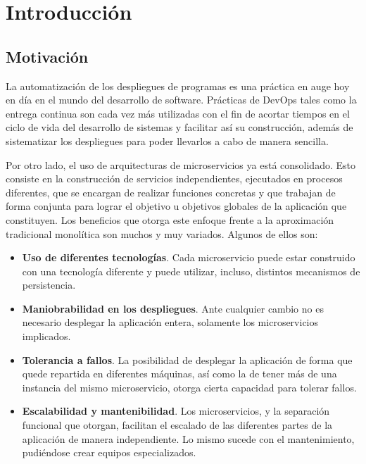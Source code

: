 \documentclass[11pt,spanish,listoffigures]{tfgetsinf}
\begin{document}
\mainmatter


\chapter{Introducción}


	\section{Motivación}

La automatización de los despliegues de programas es una práctica en auge hoy en día en el mundo del desarrollo de software. Prácticas de DevOps \cite{DevOps} tales como la entrega continua \cite{DevOpsPracticas} son cada vez más utilizadas con el fin de acortar tiempos en el ciclo de vida del desarrollo de sistemas y facilitar así su construcción, además de sistematizar los despliegues para poder llevarlos a cabo de manera sencilla.

Por otro lado, el uso de arquitecturas de microservicios \cite{Microservicios} ya está consolidado. Esto consiste en la construcción de servicios independientes, ejecutados en procesos diferentes, que se encargan de realizar funciones concretas y que trabajan de forma conjunta para lograr el objetivo u objetivos globales de la aplicación que constituyen. Los beneficios que otorga este enfoque frente a la aproximación tradicional monolítica son muchos y muy variados. Algunos de ellos son:

\begin{itemize}

	\item \textbf{Uso de diferentes tecnologías}. Cada microservicio puede estar construido con una tecnología diferente y puede utilizar, incluso, distintos mecanismos de persistencia.

	\item \textbf{Maniobrabilidad en los despliegues}. Ante cualquier cambio no es necesario desplegar la aplicación entera, solamente los microservicios implicados.

	\item \textbf{Tolerancia a fallos}. La posibilidad de desplegar la aplicación de forma que quede repartida en diferentes máquinas, así como la de tener más de una instancia del mismo microservicio, otorga cierta capacidad para tolerar fallos.

	\item \textbf{Escalabilidad y mantenibilidad}. Los microservicios, y la separación funcional que otorgan, facilitan el escalado de las diferentes partes de la aplicación de manera independiente. Lo mismo sucede con el mantenimiento, pudiéndose crear equipos especializados.

\end{itemize}
\end{document}
